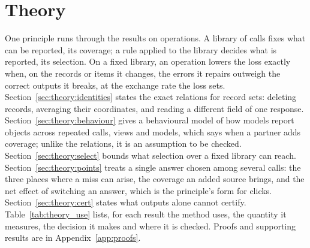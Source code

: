 \section{Theory}\label{sec:theory}

One principle runs through the results on operations. A library of calls fixes what can be reported, its coverage; a rule applied to the library decides what is reported, its selection. On a fixed library, an operation lowers the loss exactly when, on the records or items it changes, the errors it repairs outweigh the correct outputs it breaks, at the exchange rate the loss sets. Section~\ref{sec:theory:identities} states the exact relations for record sets: deleting records, averaging their coordinates, and reading a different field of one response. Section~\ref{sec:theory:behaviour} gives a behavioural model of how models report objects across repeated calls, views and models, which says when a partner adds coverage; unlike the relations, it is an assumption to be checked. Section~\ref{sec:theory:select} bounds what selection over a fixed library can reach. Section~\ref{sec:theory:points} treats a single answer chosen among several calls: the three places where a miss can arise, the coverage an added source brings, and the net effect of switching an answer, which is the principle's form for clicks. Section~\ref{sec:theory:cert} states what outputs alone cannot certify. Table~\ref{tab:theory_use} lists, for each result the method uses, the quantity it measures, the decision it makes and where it is checked. Proofs and supporting results are in Appendix~\ref{app:proofs}.

